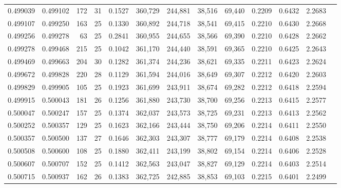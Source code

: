 \begin{tabular}{rrrrrrrrrrrrr}
0.499039 & 0.499102 &   172 &  31 &                                     0.1527 & 360,729 & 244,881 &  38,516 &  69,440 & 0.2209 & 0.6432 & 2.2683 \\
0.499107 & 0.499250 &   163 &  25 &                                     0.1330 & 360,892 & 244,718 &  38,541 &  69,415 & 0.2210 & 0.6430 & 2.2668 \\
0.499256 & 0.499278 &    63 &  25 &                                     0.2841 & 360,955 & 244,655 &  38,566 &  69,390 & 0.2210 & 0.6428 & 2.2662 \\
0.499278 & 0.499468 &   215 &  25 &                                     0.1042 & 361,170 & 244,440 &  38,591 &  69,365 & 0.2210 & 0.6425 & 2.2643 \\
0.499469 & 0.499663 &   204 &  30 &                                     0.1282 & 361,374 & 244,236 &  38,621 &  69,335 & 0.2211 & 0.6423 & 2.2624 \\
0.499672 & 0.499828 &   220 &  28 &                                     0.1129 & 361,594 & 244,016 &  38,649 &  69,307 & 0.2212 & 0.6420 & 2.2603 \\
0.499829 & 0.499905 &   105 &  25 &                                     0.1923 & 361,699 & 243,911 &  38,674 &  69,282 & 0.2212 & 0.6418 & 2.2594 \\
0.499915 & 0.500043 &   181 &  26 &                                     0.1256 & 361,880 & 243,730 &  38,700 &  69,256 & 0.2213 & 0.6415 & 2.2577 \\
0.500047 & 0.500247 &   157 &  25 &                                     0.1374 & 362,037 & 243,573 &  38,725 &  69,231 & 0.2213 & 0.6413 & 2.2562 \\
0.500252 & 0.500357 &   129 &  25 &                                     0.1623 & 362,166 & 243,444 &  38,750 &  69,206 & 0.2214 & 0.6411 & 2.2550 \\
0.500357 & 0.500500 &   137 &  27 &                                     0.1646 & 362,303 & 243,307 &  38,777 &  69,179 & 0.2214 & 0.6408 & 2.2538 \\
0.500508 & 0.500600 &   108 &  25 &                                     0.1880 & 362,411 & 243,199 &  38,802 &  69,154 & 0.2214 & 0.6406 & 2.2528 \\
0.500607 & 0.500707 &   152 &  25 &                                     0.1412 & 362,563 & 243,047 &  38,827 &  69,129 & 0.2214 & 0.6403 & 2.2514 \\
0.500715 & 0.500937 &   162 &  26 &                                     0.1383 & 362,725 & 242,885 &  38,853 &  69,103 & 0.2215 & 0.6401 & 2.2499 \\

\end{tabular}
